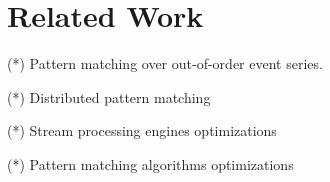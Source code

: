 \section{Related Work}

(*) Pattern matching over out-of-order event series.

(*) Distributed pattern matching

(*) Stream processing engines optimizations

(*) Pattern matching algorithms optimizations
